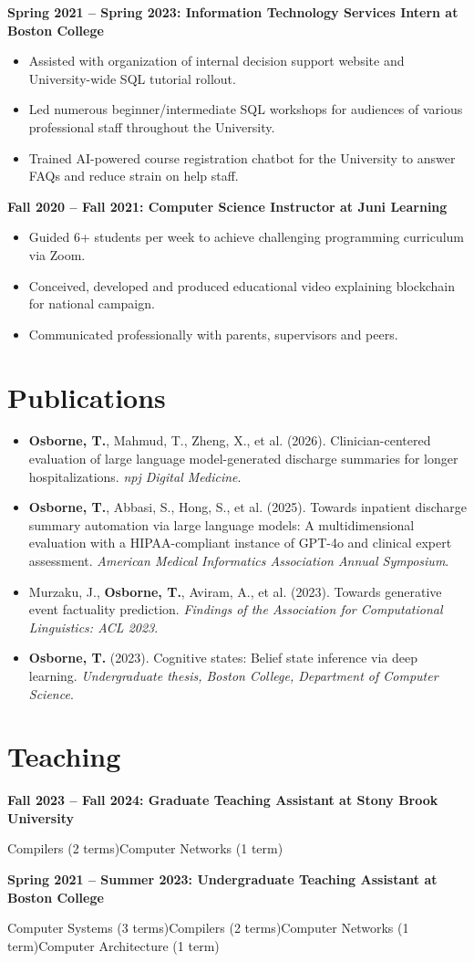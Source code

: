 \documentclass[letterpaper,10pt]{article}
\newcommand{\role}[1]{\par\vspace{5pt}\textbf{#1}\par\nopagebreak}
\newcommand{\publication}[4]{\item #1 (#2). #3. \textit{#4}.}
\begin{document}
\role{Spring 2021 -- Spring 2023: Information Technology Services Intern at Boston College}
\begin{itemize}
\item Assisted with organization of internal decision support website and University-wide SQL tutorial rollout.
\item Led numerous beginner/intermediate SQL workshops for audiences of various professional staff throughout the University.
\item Trained AI-powered course registration chatbot for the University to answer FAQs and reduce strain on help staff.
\end{itemize}
\role{Fall 2020 -- Fall 2021: Computer Science Instructor at Juni Learning}
\begin{itemize}
\item Guided 6+ students per week to achieve challenging programming curriculum via Zoom.
\item Conceived, developed and produced educational video explaining blockchain for national campaign.
\item Communicated professionally with parents, supervisors and peers.
\end{itemize}
\section{Publications}
\begin{itemize}
\publication{\textbf{Osborne, T.}, Mahmud, T., Zheng, X., et al.}{2026}
  {Clinician-centered evaluation of large language model-generated discharge summaries for longer hospitalizations}
  {npj Digital Medicine}
\publication{\textbf{Osborne, T.}, Abbasi, S., Hong, S., et al.}{2025}
  {Towards inpatient discharge summary automation via large language models: A multidimensional evaluation with a HIPAA-compliant instance of GPT-4o and clinical expert assessment}
  {American Medical Informatics Association Annual Symposium}
\publication{Murzaku, J., \textbf{Osborne, T.}, Aviram, A., et al.}{2023}
  {Towards generative event factuality prediction}
  {Findings of the Association for Computational Linguistics: ACL 2023}
\publication{\textbf{Osborne, T.}}{2023}
  {Cognitive states: Belief state inference via deep learning}
  {Undergraduate thesis, Boston College, Department of Computer Science}
\end{itemize}
\section{Teaching}
\role{Fall 2023 -- Fall 2024: Graduate Teaching Assistant at Stony Brook University}
\hspace*{12pt}Compilers (2 terms)\enspace\textbullet\enspace Computer Networks (1 term)\par
\role{Spring 2021 -- Summer 2023: Undergraduate Teaching Assistant at Boston College}
\hspace*{12pt}Computer Systems (3 terms)\enspace\textbullet\enspace Compilers (2 terms)\enspace\textbullet\enspace Computer Networks (1 term)\enspace\textbullet\enspace Computer Architecture (1 term)\par
\end{document}
